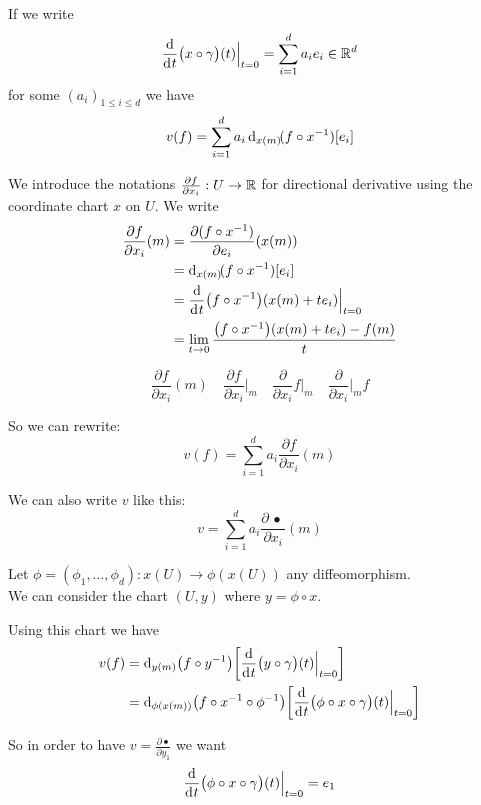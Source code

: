 		If we write
		$$
			\frac{\d}{\di{t}} \big( x \circ \gamma \big)(t) \Big|_{t=0} = \sum_{i=1}^d a_i e_i \in \R^d
		$$
		for some $(a_i)_{1 \leq i \leq d}$ we have
		$$
			v(f) = \sum_{i=1}^d a_i \di[x(m)](f \circ x^{-1})[e_i]
		$$

		We introduce the notations $\frac{\partial{f}}{\partial{x_i}}: U \to \mathbb{R}$ for directional derivative using the coordinate chart $x$ on $U$. We write
		\begin{align*}
			\frac{\partial{f}}{\partial{x_i}}(m) &= \frac{\partial{(f \circ x^{-1})}}{\partial{e_i}}(x(m)) \\
			                                     &= \di[x(m)](f \circ x^{-1})[e_i] \\
			                                     &= \frac{\d}{\di{t}} \big( f \circ x^{-1} \big)(x(m) + t e_i) \Big|_{t=0} \\
			                                     &= \lim_{t \to 0} \frac{\big( f \circ x^{-1} \big)(x(m) + t e_i) - f(m)}{t}
		\end{align*}

		$$
			\frac{\partial{f}}{\partial{x_i}}(m) \quad \frac{\partial{f}}{\partial{x_i}}\Big|_m \quad \frac{\partial}{\partial{x_i}} f \Big|_m \quad \frac{\partial}{\partial{x_i}} \Big|_m f
		$$

		So we can rewrite:
		$$
			v(f) = \sum_{i=1}^d a_i \frac{\partial f}{\partial{x_i}}(m)
		$$

		We can also write $v$ like this:
		$$
			v = \sum_{i=1}^d a_i \frac{\partial \,\bullet\,}{\partial{x_i}}(m)
		$$

		Let $\phi = (\phi_1, \ldots, \phi_d): x(U) \to \phi(x(U))$ any diffeomorphism.\\
		We can consider the chart $(U, y)$ where $y = \phi \circ x$.

		Using this chart we have
		\begin{align*}
			v(f) &= \di[y(m)] \big( f \circ y^{-1} \big) \bigg[ \frac{\d}{\di{t}} \big( y \circ \gamma \big)(t) \Big|_{t=0} \bigg] \\
			     &= \di[\phi(x(m))] \big( f \circ x^{-1} \circ \phi^{-1} \big) \bigg[ \frac{\d}{\di{t}} \big( \phi \circ x \circ \gamma \big)(t) \Big|_{t=0} \bigg]
		\end{align*}

		So in order to have $v = \frac{\partial{\bullet}}{\partial{y_1}}$ we want
		$$
			\frac{\d}{\di{t}} \big( \phi \circ x \circ \gamma \big)(t) \Big|_{t=0} = e_1
		$$

